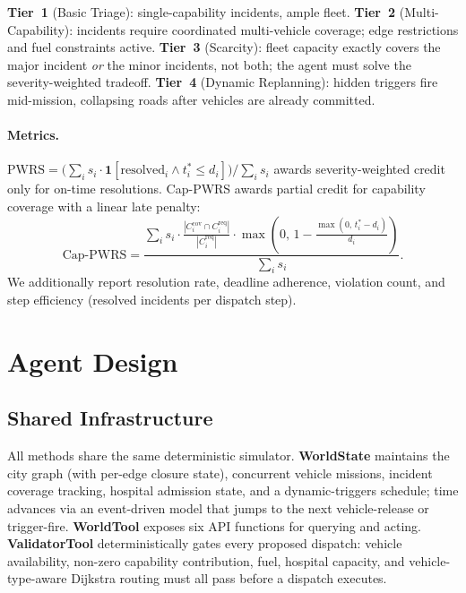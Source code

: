 \documentclass{article}
\begin{document}
\textbf{Tier~1} (Basic Triage): single-capability incidents, ample fleet.
\textbf{Tier~2} (Multi-Capability): incidents require coordinated
multi-vehicle coverage; edge restrictions and fuel constraints active.
\textbf{Tier~3} (Scarcity): fleet capacity exactly covers the major incident
\emph{or} the minor incidents, not both; the agent must solve the
severity-weighted tradeoff.
\textbf{Tier~4} (Dynamic Replanning): hidden triggers fire mid-mission,
collapsing roads after vehicles are already committed.

\paragraph{Metrics.}
$\text{PWRS} = \bigl(\sum_i s_i \cdot \mathbf{1}[\text{resolved}_i \wedge
t_i^* \leq d_i]\bigr) \big/ \sum_i s_i$
awards severity-weighted credit only for on-time resolutions.
Cap-PWRS awards partial credit for capability coverage with a linear
late penalty:
\begin{equation}
  \text{Cap-PWRS} = \frac{\displaystyle\sum_i s_i \cdot
    \frac{|C_i^{\text{cov}} \cap C_i^{\text{req}}|}{|C_i^{\text{req}}|}
    \cdot \max\!\left(0,\,1 - \tfrac{\max(0,\,t_i^*-d_i)}{d_i}\right)}
  {\displaystyle\sum_i s_i}.
  \label{eq:cappwrs}
\end{equation}
We additionally report resolution rate, deadline adherence, violation count,
and step efficiency (resolved incidents per dispatch step).

\section{Agent Design}
\label{sec:agent}

\subsection{Shared Infrastructure}

All methods share the same deterministic simulator.
\textbf{WorldState} maintains the city graph (with per-edge closure state),
concurrent vehicle missions, incident coverage tracking, hospital admission
state, and a dynamic-triggers schedule; time advances via an event-driven
model that jumps to the next vehicle-release or trigger-fire.
\textbf{WorldTool} exposes six API functions for querying and acting.
\textbf{ValidatorTool} deterministically gates every proposed dispatch:
vehicle availability, non-zero capability contribution, fuel, hospital
capacity, and vehicle-type-aware Dijkstra routing must all pass before a
dispatch executes.
\end{document}
